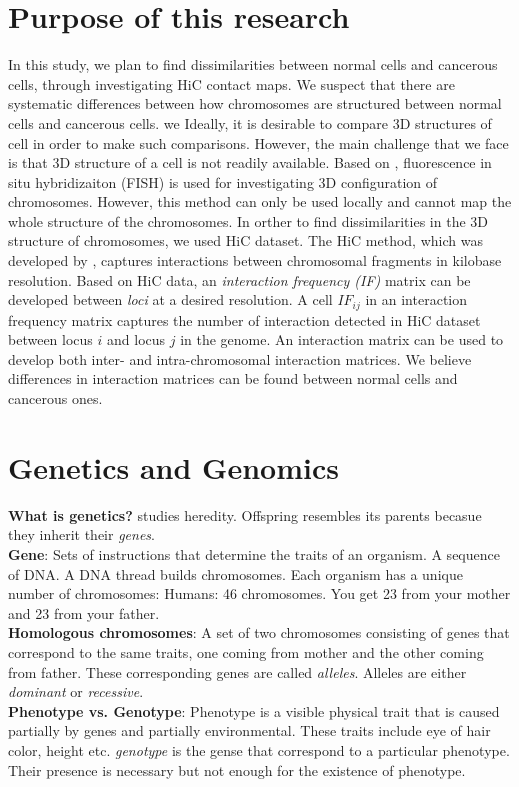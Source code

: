 \documentclass{article}
\begin{document}
\doublespacing
\setlength{\parindent}{0pt}
\section{Purpose of this research}

In this study, we plan to find dissimilarities between normal cells and cancerous cells,
through investigating HiC contact maps. 
We suspect that there are systematic differences between how chromosomes are structured
between normal cells and cancerous cells.
we 
Ideally, it is desirable to compare 3D structures of 
cell in order to make such comparisons.
However, the main challenge that we face is that 
3D structure of a cell is not readily available. Based on
\cite{adhikari2016chromosome3d}, fluorescence in situ hybridizaiton
(FISH) is used for investigating 3D configuration of chromosomes.
However, this method can only be used locally and cannot map
the whole structure of the chromosomes.
In orther to find dissimilarities in the 3D structure of 
chromosomes, we used HiC dataset.
The HiC method, which was developed by \cite{lieberman2009comprehensive}, captures interactions between 
chromosomal fragments in kilobase resolution. Based on HiC data, an
\textit{interaction frequency (IF) } matrix can be developed between \textit{loci} at a desired resolution.
A cell $IF_{ij}$ in an interaction frequency matrix captures the number of interaction detected
in HiC dataset between locus $i$ and locus $j$ in the genome.
An interaction matrix can be used to develop both inter- and intra-chromosomal interaction matrices.
We believe differences in interaction matrices can be found between normal cells and cancerous ones.

\section{Genetics and Genomics}
\textbf{What is genetics?}
studies heredity. Offspring resembles its parents becasue they
inherit their \textit{genes}.\\
\textbf{Gene}: Sets of instructions that determine the traits of an organism.
A sequence of DNA. A DNA thread builds chromosomes.
Each organism has a unique number of chromosomes:
Humans: 46 chromosomes. You get 23 from your mother and 23 from your
father.\\
\textbf{Homologous chromosomes}: A set of two chromosomes consisting of genes
that correspond to the same traits, one coming from mother and the 
other coming from father. These corresponding genes are called
\textit{alleles}. Alleles are either \textit{dominant} or \textit{
    recessive}.\\
\textbf{Phenotype vs. Genotype}: Phenotype is a visible physical trait that
is caused partially by genes and partially environmental.
These traits include eye of hair color, height etc.
\textit{genotype} is the gense that correspond to a particular
phenotype. 
Their presence is necessary but not enough for the 
existence of phenotype.
\end{document}
